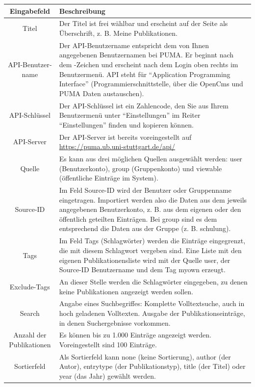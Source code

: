\begin{longtable}{|c|p{7cm}|}\hline
\bfseries Eingabefeld &\bfseries Beschreibung\\ \hline
Titel& 	Der Titel ist frei wählbar und erscheint auf der Seite als Überschrift, z. B. Meine Publikationen. \\ \hline
API-Benutzer­­name &	Der API-Benutzername entspricht dem von Ihnen angegebenen Benutzernamen bei PUMA. Er beginnt nach dem \@-Zeichen und erscheint nach dem Login oben rechts im Benutzermenü. API steht für \enquote{Application Programming Interface} (Programmierschnittstelle, über die OpenCms und PUMA Daten austauschen).\\ \hline
API-Schlüssel &	Der API-Schlüs­sel ist ein Zahlencode, den Sie aus Ihrem Benutzermenü unter \enquote{Einstellungen} im Reiter \enquote{Einstellungen} finden und kopieren können.\\ \hline
API-Server &	Der API-Server ist bereits voreingestellt auf \url{https://puma.ub.uni-stuttgart.de/api/}\\ \hline
Quelle & Es kann aus drei möglichen Quellen ausgewählt werden: user (Benutzerkonto), group (Gruppenkonto) und viewable (öffentliche Einträge im System).\\ \hline
Source-ID &	Im Feld Source-ID wird der Benutzer oder Gruppenname eingetragen. Importiert werden also die Daten aus dem jeweils angegebenen Benutzerkonto, z. B. aus dem eigenen oder den öffentlich geteilten Einträgen. Bei group sind es dem entsprechend die Daten aus der Gruppe (z. B. schulung).\\ \hline
Tags &	Im Feld Tags (Schlagwörter) werden die Einträge eingegrenzt, die mit diesem Schlagwort vergeben sind. Eine Liste mit den eigenen Publikationensliste wird mit der Quelle user, der Source-ID Benutzername und dem Tag myown erzeugt.\\ \hline
Exclude-Tags& An dieser Stelle werden die Schlagwörter eingegeben, zu denen keine Publikationen angezeigt werden sollen.\\ \hline
Search &	Angabe eines Suchbegriffes: Komplette Volltextsuche, auch in hoch geladenen Volltexten. Ausgabe der Publikationseinträge, in denen Suchergebnisse vorkommen.\\ \hline
Anzahl der Pub­li­ka­tionen &	Es können bis zu 1.000 Einträge angezeigt werden. Voreingestellt sind 100 Einträge.\\ \hline
Sortierfeld &	Als Sortierfeld kann none (keine Sortierung), author (der Autor), entrytype (der Publikationstyp), title (der Titel) oder year (das Jahr) gewählt werden.\\ \hline

\end{longtable}
